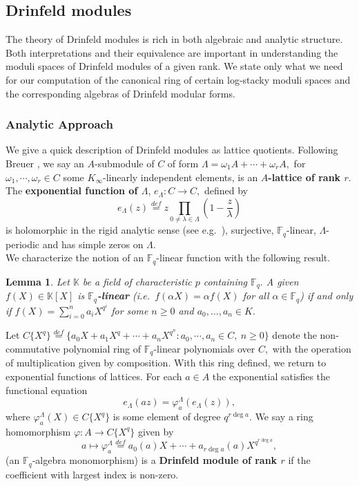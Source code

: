 \documentclass[11pt]{amsart}
\newtheorem{lemma}[theorem]{Lemma}
\theoremstyle{definition}
\numberwithin{equation}{section}
\newcommand{\bbF}{\mathbb{F}}		%
\newcommand{\bbK}{\mathbb{K}}		%
\begin{document}
		\subsection{Drinfeld modules}
		
		The theory of Drinfeld modules is rich in both algebraic and analytic structure. Both interpretations and their equivalence are important in understanding the moduli spaces of Drinfeld modules of a given rank. We state only what we need for our computation of the canonical ring of certain log-stacky moduli spaces and the corresponding algebras of Drinfeld modular forms. 
		
		\subsubsection{Analytic Approach}
		
		We give a quick description of Drinfeld modules as lattice quotients. 
		Following Breuer \cite{Breuer-Gekeler-h-function}, we say an $A$-submodule of $C$ of form $\Lambda = \omega_1A+\cdots+\omega_rA,$ for $\omega_1,\cdots, \omega_r\in C$ some $K_{\infty}$-linearly independent elements, is an \textbf{$A$-lattice of rank $r.$} The \textbf{exponential function of $\Lambda$}, $e_{\Lambda}:C\to C,$ defined by
		\[e_{\Lambda}(z)\overset{def}{=}z\prod_{0\neq \lambda \in \Lambda}\left(1-\frac{z}{\lambda}\right) \] is holomorphic in the rigid analytic sense (see e.g.\ \cite[Definition $2.2.1$]{Frensel-vanderPut-Rigid-Analytic_Geom}), surjective, $\bbF_q$-linear, $\Lambda$-periodic and has simple zeros on $\Lambda.$\\
		
		We characterize the notion of an $\bbF_q$-linear function with the following result.
		\begin{lemma}
			Let $\bbK$ be a field of characteristic $p$ containing $\bbF_q.$ A given $f(X)\in \bbK[X]$ is \textbf{$\bbF_q$-linear} (i.e.\ $f(\alpha X)=\alpha f(X)$ for all $\alpha \in \bbF_q$) if and only if $\displaystyle{f(X)=\sum_{i=0}^n a_iX^{q^i}}$ for some $n\geq 0$ and $a_0,\ldots, a_n\in K.$
		\end{lemma}
		
		Let $C\{X^q\}\overset{def}{=}\{a_0X+a_1X^q+\cdots+a_nX^{q^n}: a_0,\cdots, a_n\in C, ~n\geq 0 \}$ denote the non-commutative polynomial ring of $\bbF_q$-linear polynomials over $C,$ with the operation of multiplication given by composition. With this ring defined, we return to exponential functions of lattices. For each $a\in A$ the exponential satisfies the functional equation 
		\[e_{\Lambda}(az)=\varphi_a^{\Lambda}(e_{\Lambda}(z)),\]
		where $\varphi_a^{\Lambda}(X)\in C\{X^q\}$ is some element of degree $q^{r\deg a}.$
		We say a ring homomorphism $\varphi: A\to C\{X^q\}$ given by \[a\mapsto \varphi_a^{\Lambda}\overset{def}{=}a_0(a)X+\cdots+a_{r\deg a}(a)X^{q^{r\deg a}},\]
		(an $\bbF_q$-algebra monomorphism) is a \textbf{Drinfeld module of rank $r$} if the coefficient with largest index is non-zero.
		
\end{document}
